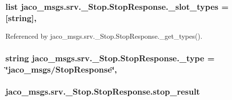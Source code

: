 \subsubsection[{\texorpdfstring{\+\_\+slot\+\_\+types}{_slot_types}}]{\setlength{\rightskip}{0pt plus 5cm}list jaco\+\_\+msgs.\+srv.\+\_\+\+Stop.\+Stop\+Response.\+\_\+slot\+\_\+types = \mbox{[}\textquotesingle{}string\textquotesingle{}\mbox{]}\hspace{0.3cm}{\ttfamily [static]}, {\ttfamily [private]}}\hypertarget{classjaco__msgs_1_1srv_1_1__Stop_1_1StopResponse_a4a5d8d79daf62c3900247c1d3ff26bf7}{}\label{classjaco__msgs_1_1srv_1_1__Stop_1_1StopResponse_a4a5d8d79daf62c3900247c1d3ff26bf7}


Referenced by jaco\+\_\+msgs.\+srv.\+\_\+\+Stop.\+Stop\+Response.\+\_\+get\+\_\+types().

\subsubsection[{\texorpdfstring{\+\_\+type}{_type}}]{\setlength{\rightskip}{0pt plus 5cm}string jaco\+\_\+msgs.\+srv.\+\_\+\+Stop.\+Stop\+Response.\+\_\+type = \char`\"{}jaco\+\_\+msgs/{\bf Stop\+Response}\char`\"{}\hspace{0.3cm}{\ttfamily [static]}, {\ttfamily [private]}}\hypertarget{classjaco__msgs_1_1srv_1_1__Stop_1_1StopResponse_aaa032d40f9b684bdde7134dccfa89729}{}\label{classjaco__msgs_1_1srv_1_1__Stop_1_1StopResponse_aaa032d40f9b684bdde7134dccfa89729}
\subsubsection[{\texorpdfstring{stop\+\_\+result}{stop_result}}]{\setlength{\rightskip}{0pt plus 5cm}jaco\+\_\+msgs.\+srv.\+\_\+\+Stop.\+Stop\+Response.\+stop\+\_\+result}\hypertarget{classjaco__msgs_1_1srv_1_1__Stop_1_1StopResponse_ae2263a254672fbbe4d311a1cc5cf56cc}{}\label{classjaco__msgs_1_1srv_1_1__Stop_1_1StopResponse_ae2263a254672fbbe4d311a1cc5cf56cc}


